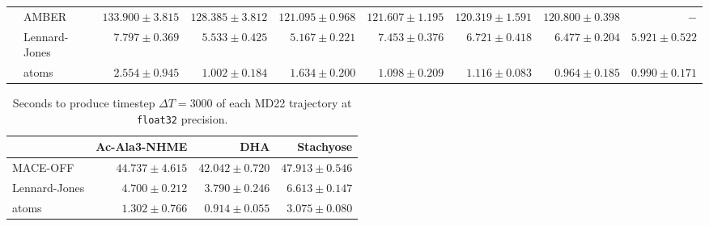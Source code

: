 \begin{table}[H]
{\begin{tabular}{llrrrrrrr}
              &   AMBER
              & \(133.900\pm\scriptstyle{3.815}\) 
              & \(128.385\pm\scriptstyle{3.812}\) 
              & \(121.095\pm\scriptstyle{0.968}\) 
              & \(121.607\pm\scriptstyle{1.195}\) 
              & \(120.319\pm\scriptstyle{1.591}\) 
              & \(120.800\pm\scriptstyle{0.398}\) 
              & \(-\) \\
            
              & Lennard-Jones
              & \(7.797\pm\scriptstyle{0.369}\) 
              & \(5.533\pm\scriptstyle{0.425}\) 
              & \(5.167\pm\scriptstyle{0.221}\) 
              & \(7.453\pm\scriptstyle{0.376}\) 
              & \(6.721\pm\scriptstyle{0.418}\) 
              & \(6.477\pm\scriptstyle{0.204}\) 
              & \(5.921\pm\scriptstyle{0.522}\) \\
    
              & \gls{atoms}
              & \(2.554\pm\scriptstyle{0.945}\) 
              & \(1.002\pm\scriptstyle{0.184}\) 
              & \(1.634\pm\scriptstyle{0.200}\) 
              & \(1.098\pm\scriptstyle{0.209}\) 
              & \(1.116\pm\scriptstyle{0.083}\) 
              & \(0.964\pm\scriptstyle{0.185}\) 
              & \(0.990\pm\scriptstyle{0.171}\) \\
            \bottomrule
        \end{tabular}
    }
\end{table}

\begin{table}[H]
    \centering
    \caption{Seconds to produce timestep \(\Delta T = 3000\) of each MD22 trajectory at \texttt{float32} precision.}
    \label{tab:inference_md22}
        \begin{tabular}{lrrr}
            \toprule
             & Ac-Ala3-NHME & DHA & Stachyose \\
            \midrule 
            MACE-OFF & \(44.737\pm\scriptstyle{4.615}\) & \(42.042\pm\scriptstyle{0.720}\) & \(47.913\pm\scriptstyle{0.546}\) \\
            
            Lennard-Jones & \(4.700\pm\scriptstyle{0.212}\) & \(3.790\pm\scriptstyle{0.246}\) & \(6.613\pm\scriptstyle{0.147}\) \\
    
            \gls{atoms} & \(1.302\pm\scriptstyle{0.766}\) & \(0.914\pm\scriptstyle{0.055}\) & \(3.075\pm\scriptstyle{0.080}\) \\
            \bottomrule
        \end{tabular}
\end{table}

